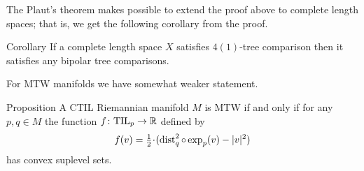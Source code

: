The Plaut's theorem makes possible to extend the proof above to complete length spaces;
that is, we get the following corollary from the proof.

\begin{thm}{Corollary}\label{cor:4(1)=>n(1)}
If a complete length space $X$ satisfies $4(1)$-tree comparison then it satisfies any bipolar tree comparisons.
\end{thm}

For MTW manifolds we have somewhat weaker statement.

\begin{thm}{Proposition}\label{prop:convexity}
A CTIL Riemannian manifold $M$ is MTW if and only if 
for any $p,q\in M$ the function $f\colon \mathrm{\rm TIL}_p\to \mathbb{R}$ defined by
\[f(v)=\tfrac12\cdot(\dist_q^2\circ\exp_p(v)-|v|^2)\] 
has convex suplevel sets.
\end{thm}